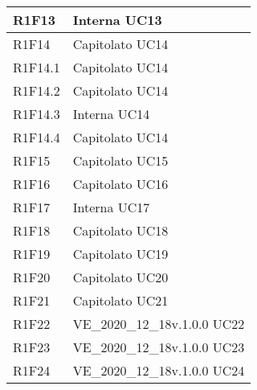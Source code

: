 \begin{center}
\begin{longtable}{|p{22mm}|p{44mm}|}
R1F13 &
Interna \newline
UC13 
\\
\hline

R1F14 &
Capitolato \newline
UC14 
\\
\hline

R1F14.1 &
Capitolato \newline
UC14 
\\
\hline

R1F14.2 &
Capitolato \newline
UC14 
\\
\hline

R1F14.3 &
Interna \newline
UC14 
\\
\hline

R1F14.4 &
Capitolato \newline
UC14 
\\
\hline

R1F15 &
Capitolato \newline
UC15 
\\
\hline

R1F16 &
Capitolato \newline
UC16 
\\
\hline

R1F17 &
Interna \newline
UC17 
\\
\hline

R1F18 &
Capitolato \newline
UC18 
\\
\hline

R1F19 &
Capitolato \newline
UC19 
\\
\hline

R1F20 &
Capitolato \newline
UC20 
\\
\hline

R1F21 &
Capitolato \newline
UC21 
\\
\hline

R1F22 &
VE\_2020\_12\_18v.1.0.0 \newline
UC22 
\\
\hline

R1F23 &
VE\_2020\_12\_18v.1.0.0 \newline
UC23 
\\
\hline

R1F24 &
VE\_2020\_12\_18v.1.0.0 \newline
UC24 
\\
\hline


\end{longtable}
\end{center}
